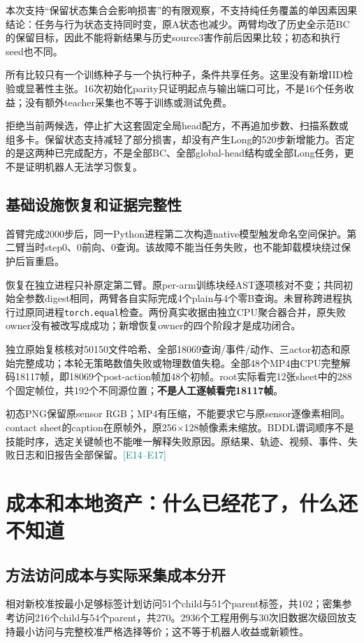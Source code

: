 \documentclass[UTF8,a4paper,fontset=none,zihao=-4]{ctexart}
\newcommand{\ev}[1]{\textcolor{teal}{\small[#1]}}
\begin{document}
本次支持“保留状态集合会影响损害”的有限观察，不支持纯任务覆盖的单因素因果结论：任务与行为状态支持同时变，原A状态也减少。两臂均改了历史全示范BC的保留目标，因此不能将新结果与历史source3害作前后因果比较；初态和执行seed也不同。

所有比较只有一个训练种子与一个执行种子，条件共享任务。这里没有新增IID检验或显著性主张。16次初始化parity只证明起点与输出端口可比，不是16个任务收益；没有额外teacher采集也不等于训练或测试免费。
\begin{keybox}[title=这次门槛的决定]
拒绝当前两候选，停止扩大这套固定全局head配方，不再追加步数、扫描系数或组多卡。保留状态支持减轻了部分损害，却没有产生Long的520步新增能力。否定的是这两种已完成配方，不是全部BC、全部global-head结构或全部Long任务，更不是证明机器人无法学习恢复。
\end{keybox}
\subsection{基础设施恢复和证据完整性}
首臂完成2000步后，同一Python进程第二次构造native模型触发命名空间保护。第二臂当时step0、0前向、0查询。该故障不能当任务失败，也不能卸载模块绕过保护后盲重启。

恢复在独立进程只补原定第二臂。原per-arm训练块经AST逐项核对不变；共同初始全参数digest相同，两臂各自实际完成4个plain与4个零B查询。未冒称跨进程执行过原同进程\texttt{torch.equal}检查。两份真实收据由独立CPU聚合器合并，原失败owner没有被改写成成功；新增恢复owner的四个阶段才是成功闭合。

独立原始复核核对50150文件哈希、全部18069查询/事件/动作、三actor初态和原始完整成功；本轮无策略数值失败或物理数值失稳。全部48个MP4由CPU完整解码18117帧，即18069个post-action帧加48个初帧。root实际看完12张sheet中的288个固定帧位，共192个不同源位置；\textbf{不是人工逐帧看完18117帧}。

初态PNG保留原sensor RGB；MP4有压缩，不能要求它与原sensor逐像素相同。contact sheet的caption在原帧外，原256$\times$128帧像素未缩放。BDDL谓词顺序不是技能时序，选定关键帧也不能唯一解释失败原因。原结果、轨迹、视频、事件、失败日志和旧报告全部保留。\ev{E14--E17}
\section{成本和本地资产：什么已经花了，什么还不知道}
\subsection{方法访问成本与实际采集成本分开}
相对新校准按最小足够标签计划访问51个child与51个parent标签，共102；密集参考访问216个child与54个parent，共270。2936个工程用例与30次旧数据次级回放支持最小访问与完整校准严格选择等价；这不等于机器人收益或新颖性。
\end{document}
